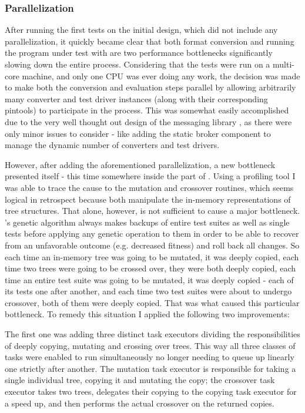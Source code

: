 \subsubsection{Parallelization}
\label{sec:par}
After running the first tests on the initial \xmlmate design, which did not include any parallelization, 
it quickly became clear that both format conversion and running the program under test with \pin 
are two performance bottlenecks significantly slowing down the entire process. Considering that the 
tests were run on a multi-core machine, and only one CPU was ever doing any work, the decision was 
made to make both the conversion and evaluation steps parallel by allowing arbitrarily many 
converter and test driver instances (along with their corresponding pintools) to participate in the process. 
This was somewhat easily accomplished due to the very well thought out design of the messaging library \zmq, 
as there were only minor issues to consider - like adding the static broker component to 
manage the dynamic number of converters and test drivers.

However, after adding the aforementioned parallelization, a new bottleneck presented itself - this time 
somewhere inside the \java part of \xmlmate. Using a \java profiling tool I was able to trace the cause 
to the mutation and crossover routines, which seems logical in retrospect because both manipulate the 
in-memory representations of \xml tree structures. That alone, however, is not sufficient to cause a 
major bottleneck. \evosuite's genetic algorithm always makes backups of entire test suites as well as 
single tests before applying any genetic operation to them in order to be able to recover from an 
unfavorable outcome (e.g. decreased fitness) and roll back all changes. So each time an in-memory \xml 
tree was going to be mutated, it was deeply copied, each time two \xml trees were going to be crossed 
over, they were both deeply copied, each time an entire test suite was going to be mutated, it was 
deeply copied - each of its tests one after another, and each time two test suites were about to 
undergo crossover, both of them were deeply copied. That was what caused this particular bottleneck. 
To remedy this situation I applied the following two improvements:

The first one was adding three distinct task executors dividing the responsibilities of deeply copying, mutating and 
crossing over \xml trees. This way all three classes of tasks were enabled to run simultaneously 
no longer needing to queue up linearly one strictly after another. The mutation task executor is 
responsible for taking a single individual \xml tree, copying it and mutating the copy; the 
crossover task executor takes two \xml trees, delegates their copying to the copying task executor 
for a speed up, and then performs the actual crossover on the returned copies.

